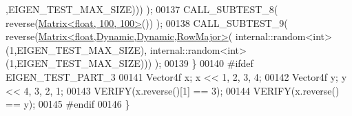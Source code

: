 \begin{DoxyCode}
      ,EIGEN\_TEST\_MAX\_SIZE))) );
00137     CALL\_SUBTEST\_8( reverse(\hyperlink{group___core___module_class_eigen_1_1_matrix}{Matrix<float, 100, 100>}()) );
00138     CALL\_SUBTEST\_9( reverse(\hyperlink{group___core___module_class_eigen_1_1_matrix}{Matrix<float,Dynamic,Dynamic,RowMajor>}(
      internal::random<int>(1,EIGEN\_TEST\_MAX\_SIZE), internal::random<int>(1,EIGEN\_TEST\_MAX\_SIZE))) );
00139   \}
00140 \textcolor{preprocessor}{#ifdef EIGEN\_TEST\_PART\_3}
00141   Vector4f x; x << 1, 2, 3, 4;
00142   Vector4f y; y << 4, 3, 2, 1;
00143   VERIFY(x.reverse()[1] == 3);
00144   VERIFY(x.reverse() == y);
00145 \textcolor{preprocessor}{#endif}
00146 \}
\end{DoxyCode}
